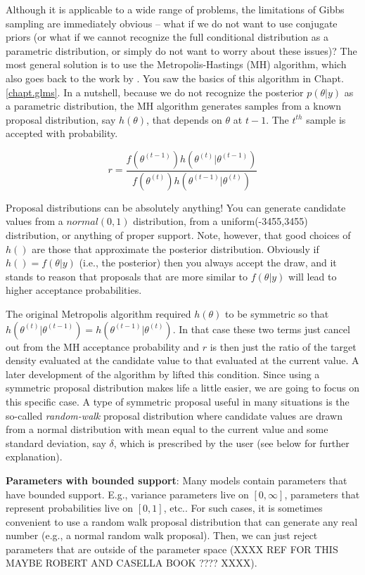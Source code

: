 Although it is applicable to a wide range of problems, the limitations
of Gibbs sampling are immediately obvious – what if we do not want to
use conjugate priors (or what if we cannot recognize the full
conditional distribution as a parametric distribution, or simply do
not want to worry about these issues)? The most general solution is to
use the Metropolis-Hastings (MH) algorithm, which also goes back to
the work by \citet{metropolis_ulam:1953}. You saw the basics of this
algorithm in Chapt. \ref{chapt.glms}. In a nutshell, because we do not recognize the
posterior $p(\theta|y)$ as a parametric distribution, the MH algorithm
generates samples from a known proposal distribution, say $h(\theta)$,
that depends on $\theta$ at $t-1$. The $t^{th}$ sample is accepted with probability. 

\[
r = \frac{ f(\theta^{(t-1)}) h(\theta^{(t)}|\theta^{(t-1)})}
    {f(\theta^{(t)}) h(\theta^{(t-1)}|\theta^{(t)}) }
\]

Proposal distributions can be absolutely
anything!  You can generate candidate values from a $normal(0,1)$
distribution, from a uniform(-3455,3455) distribution, or anything of
proper support.  Note, however, that good choices of $h()$ are those
that approximate the posterior distribution. Obviously if $h() =
f(\theta|y)$ (i.e., the posterior) then you always accept the draw,
and it stands to reason that proposals that are more similar to
$f(\theta|y)$ will lead to higher acceptance probabilities. 

The original Metropolis algorithm
required $h(\theta)$ to be symmetric so that
$h(\theta^{(t)}|\theta^{(t-1)}) = h(\theta^{(t-1)}|\theta^{(t)})$. 
In that case these two terms just cancel
out from the MH acceptance probability and $r$ is then just the ratio
of the target density evaluated at the candidate value to that
evaluated at the current value. A later
development of the algorithm by \citet{hastings:1970} lifted this
condition. 
Since using a symmetric proposal distribution makes life a little
easier, we are going to focus on this specific case. A type of symmetric proposal useful in many situations is the
so-called {\it random-walk} proposal distribution where candidate values
are drawn from a normal distribution with mean equal to the current
value and some standard deviation, say $\delta$, which is prescribed by
the user (see below for further explanation). 

{\bf Parameters with bounded support}: Many models contain parameters that
have  bounded support. E.g., variance parameters live on $[0,\infty]$,
parameters that represent probabilities live on $[0,1]$, etc..
For such cases, it is sometimes convenient to use a random
walk proposal distribution that can generate any real number (e.g., a
normal random walk proposal). Then, 
we can just reject parameters that are
outside of the parameter space (XXXX REF FOR THIS MAYBE ROBERT AND
CASELLA BOOK ???? XXXX).

